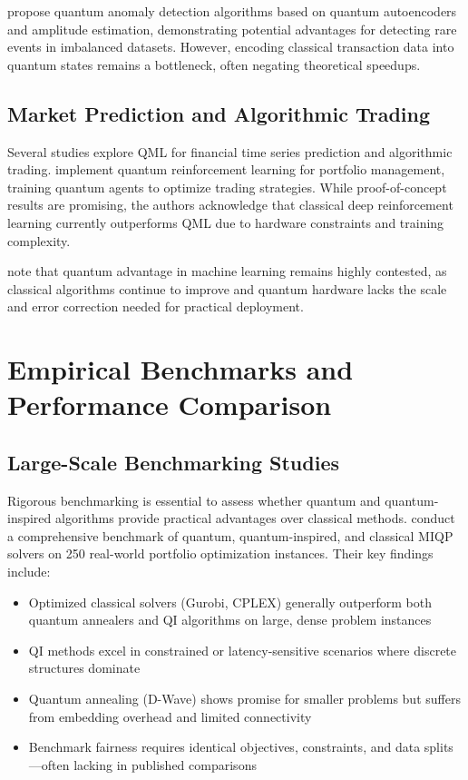 \documentclass[12pt]{article}
\numberwithin{equation}{section}
\begin{document}
\citet{Kyriienko2021QuantumAnomalyDetection} propose quantum anomaly detection algorithms based on quantum autoencoders and amplitude estimation, demonstrating potential advantages for detecting rare events in imbalanced datasets. However, encoding classical transaction data into quantum states remains a bottleneck, often negating theoretical speedups.

\subsection{Market Prediction and Algorithmic Trading}

Several studies explore QML for financial time series prediction and algorithmic trading. \citet{Chen2023QuantumTrading} implement quantum reinforcement learning for portfolio management, training quantum agents to optimize trading strategies. While proof-of-concept results are promising, the authors acknowledge that classical deep reinforcement learning currently outperforms QML due to hardware constraints and training complexity.

\citet{Orus2019} note that quantum advantage in machine learning remains highly contested, as classical algorithms continue to improve and quantum hardware lacks the scale and error correction needed for practical deployment.

\section{Empirical Benchmarks and Performance Comparison}
\label{sec:benchmarks}

\subsection{Large-Scale Benchmarking Studies}

Rigorous benchmarking is essential to assess whether quantum and quantum-inspired algorithms provide practical advantages over classical methods. \citet{Stopfer2025Benchmark} conduct a comprehensive benchmark of quantum, quantum-inspired, and classical MIQP solvers on 250 real-world portfolio optimization instances. Their key findings include:

\begin{itemize}[leftmargin=*]
\item Optimized classical solvers (Gurobi, CPLEX) generally outperform both quantum annealers and QI algorithms on large, dense problem instances
\item QI methods excel in constrained or latency-sensitive scenarios where discrete structures dominate
\item Quantum annealing (D-Wave) shows promise for smaller problems but suffers from embedding overhead and limited connectivity
\item Benchmark fairness requires identical objectives, constraints, and data splits—often lacking in published comparisons
\end{itemize}
\end{document}
